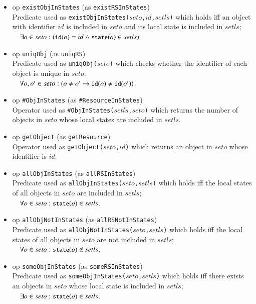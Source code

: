 \documentclass[12pt]{report}
\newcommand{\ra}{\rightarrow}
\newcommand{\mbstt}[1]{\mbox{\small{\tt {#1}}}}
\newcommand{\stt}[1]{{\small{\tt {#1}}}}
\begin{document}
\begin{itemize}
\item op \stt{existObjInStates} (as \stt{existRSInStates})\\
  Predicate used as \stt{existObjInStates($seto$,$id$,$setls$)} which
  holds iff an object with identifier $id$ is included in $seto$ and
  its local state is included in $setls$;\\$~~~~\exists o\in seto:
  (\mbstt{id}(o)=id \land \mbstt{state}(o)\in setls)$.
\item op \stt{uniqObj} (as \stt{uniqRS})\\
  Predicate used as \stt{uniqObj($seto$)} which checks whether the
  identifier of each object is unique in $seto$;\\$~~~~\forall o,o'\in
  seto:(o\ne o'\ra\mbstt{id}(o)\ne\mbstt{id}(o'))$.
\item op \stt{\#ObjInStates} (as \stt{\#ResourceInStates})\\ 
  Operator used as \stt{\#ObjInStates($setls$,$seto$)} which returns
  the number of objects in $seto$ whose local states are
  included in $setls$.
\item op \stt{getObject} (as \stt{getResource})\\ 
  Operator used as \stt{getObject($seto$,$id$)} which returns an
  object in $seto$ whose identifier is $id$.
\item op \stt{allObjInStates} (as \stt{allRSInStates})\\
  Predicate used as \stt{allObjInStates($seto$,$setls$)} which holds iff
  the local states of all objects in $seto$ are included
  in $setls$;\\$~~~~\forall o\in seto:\mbstt{state}(o)\in setls$.
\item op \stt{allObjNotInStates} (as \stt{allRSNotInStates})\\
  Predicate used as \stt{allObjNotInStates($seto$,$setls$)} which holds iff
  the local states of all objects in $seto$ are not included
  in $setls$;\\$~~~~\forall o\in seto:\mbstt{state}(o)\not\in setls$.
\item op \stt{someObjInStates} (as \stt{someRSInStates})\\ 
  Predicate used as \stt{someObjInStates($seto$,$setls$)} which holds
  iff there exists an objects in $seto$ whose local state is included
  in $setls$;\\$~~~~\exists o\in seto:\mbstt{state}(o)\in setls$.

\end{itemize}
\end{document}
